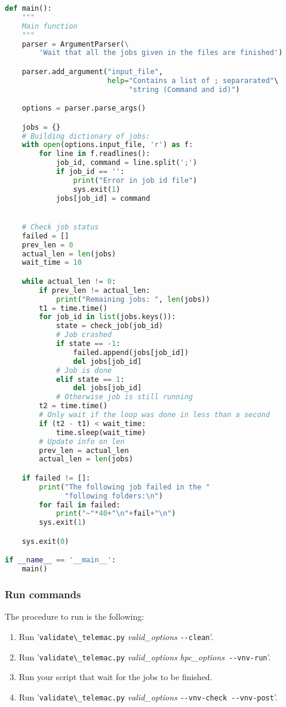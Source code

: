 \begin{lstlisting}[language=python,basicstyle=\footnotesize,keywordstyle=\color{blue}\footnotesize]
def main():
    """
    Main function
    """
    parser = ArgumentParser(\
        'Wait that all the jobs given in the files are finished')

    parser.add_argument("input_file",
                        help="Contains a list of ; separarated"\
                             "string (Command and id)")

    options = parser.parse_args()

    jobs = {}
    # Building dictionary of jobs:
    with open(options.input_file, 'r') as f:
        for line in f.readlines():
            job_id, command = line.split(';')
            if job_id == '':
                print("Error in job id file")
                sys.exit(1)
            jobs[job_id] = command


    # Check job status
    failed = []
    prev_len = 0
    actual_len = len(jobs)
    wait_time = 10

    while actual_len != 0:
        if prev_len != actual_len:
            print("Remaining jobs: ", len(jobs))
        t1 = time.time()
        for job_id in list(jobs.keys()):
            state = check_job(job_id)
            # Job crashed
            if state == -1:
                failed.append(jobs[job_id])
                del jobs[job_id]
            # Job is done
            elif state == 1:
                del jobs[job_id]
            # Otherwise job is still running
        t2 = time.time()
        # Only wait if the loop was done in less than a second
        if (t2 - t1) < wait_time:
            time.sleep(wait_time)
        # Update info on len
        prev_len = actual_len
        actual_len = len(jobs)

    if failed != []:
        print("The following job failed in the "
              "following folders:\n")
        for fail in failed:
            print("~"*40+"\n"+fail+"\n")
        sys.exit(1)

    sys.exit(0)

if __name__ == '__main__':
    main()
\end{lstlisting}

\subsubsection{Run commands}

The procedure to run is the following:
\begin{enumerate}
  \item Run '\verb!validate\_telemac.py! \textit{valid\_options} \verb!--clean!'.
  \item Run '\verb!validate\_telemac.py! \textit{valid\_options} \textit{hpc\_options}\verb! --vnv-run!'.
  \item Run your script that wait for the jobs to be finished.
  \item Run '\verb!validate\_telemac.py! \textit{valid\_options} \verb!--vnv-check --vnv-post!'.
\end{enumerate}

